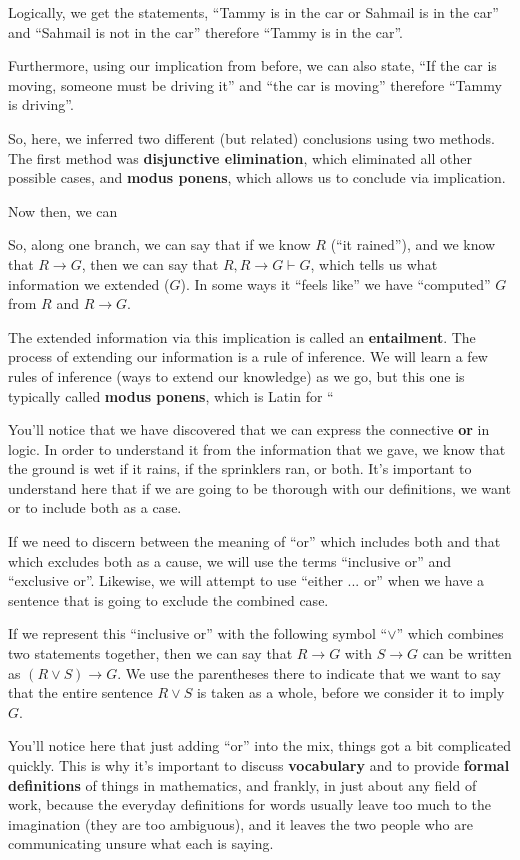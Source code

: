 Logically, we get the statements, ``Tammy is in the car or Sahmail is in the car'' and ``Sahmail is not in the car'' therefore ``Tammy is in the car''.

Furthermore, using our implication from before, we can also state, ``If the car is moving, someone must be driving it'' and ``the car is moving'' therefore ``Tammy is driving''.

So, here, we inferred two different (but related) conclusions using two methods. The first method was \textbf{disjunctive elimination}, which eliminated all other possible cases, and \textbf{modus ponens}, which allows us to conclude via implication. 

Now then, we can 


So, along one branch, we can say that if we know $R$ (``it rained''), and we know that $R \to G$, then we can say that $R, R\to G \vdash G$, which tells us what information we extended ($G$). In some ways it ``feels like'' we have ``computed'' $G$ from $R$ and $R \to G$.

The extended information via this implication is called an \textbf{entailment}. The process of extending our information is a rule of inference. We will learn a few rules of inference (ways to extend our knowledge) as we go, but this one is typically called \textbf{modus ponens}, which is Latin for ``

You'll notice that we have discovered that we can express the connective \textbf{or} in logic. In order to understand it from the information that we gave, we know that the ground is wet if it rains, if the sprinklers ran, or both. It's important to understand here that if we are going to be thorough with our definitions, we want or to include both as a case.

If we need to discern between the meaning of ``or'' which includes both and that which excludes both as a cause, we will use the terms ``inclusive or'' and ``exclusive or''. Likewise, we will attempt to use ``either ... or'' when we have a sentence that is going to exclude the combined case.

If we represent this ``inclusive or'' with the following symbol ``$\vee$'' which combines two statements together, then we can say that $R \to G$ with $S \to G$ can be written as $(R \vee S) \to G$. We use the parentheses there to indicate that we want to say that the entire sentence $R \vee S$ is taken as a whole, before we consider it to imply $G$.

You'll notice here that just adding ``or'' into the mix, things got a bit complicated quickly. This is why it's important to discuss \textbf{vocabulary} and to provide \textbf{formal definitions} of things in mathematics, and frankly, in just about any field of work, because the everyday definitions for words usually leave too much to the imagination (they are too ambiguous), and it leaves the two people who are communicating unsure what each is saying.

